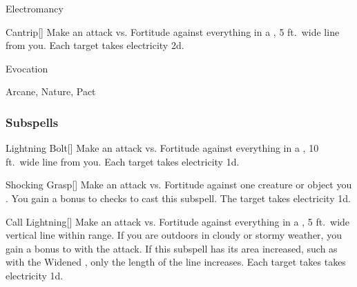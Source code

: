 \newpage
\begin{spellsection}{Electromancy}

\begin{spellheader}
\end{spellheader}


\begin{ability}{Cantrip}[]
Make an attack vs. Fortitude against everything in a \areamed, 5 ft.\ wide line from you.
\hit Each target takes electricity  \minus2d.
\end{ability}




 Evocation

 Arcane, Nature, Pact
\end{spellsection}


\subsubsection{Subspells}


\begin{ability}[\nth{1}]{Lightning Bolt}[]
Make an attack vs. Fortitude against everything in a \arealarge, 10 ft.\ wide line from you.
\hit Each target takes electricity  \minus1d.
\end{ability}
\vspace{0.25em}


\begin{ability}[\nth{1}]{Shocking Grasp}[]
Make an attack vs. Fortitude against one creature or object you .
You gain a  bonus to  checks to cast this subspell.
\hit The target takes electricity  \plus1d.
\end{ability}
\vspace{0.25em}


\begin{ability}[\nth{2}]{Call Lightning}[]
Make an attack vs. Fortitude against everything in a \arealarge, 5 ft.\ wide vertical line within \rngmed range.
If you are outdoors in cloudy or stormy weather, you gain a  bonus to  with the attack.
If this subspell has its area increased, such as with the Widened , only the length of the line increases.
\hit Each target takes takes electricity  \plus1d.
\end{ability}
\vspace{0.25em}


